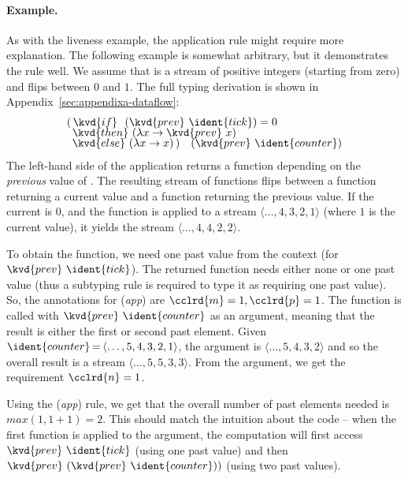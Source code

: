 
\paragraph{Example.}
As with the liveness example, the application rule might require more explanation. The following
example is somewhat arbitrary, but it demonstrates the rule well. We assume that 
is a stream of positive integers (starting from zero) and  flips between $0$ and $1$.
The full typing derivation is shown in Appendix~\ref{sec:appendixa-dataflow}:
%
\begin{equation*}
\begin{array}{l}
(\,   \kvd{if}~~(\kvd{prev}~\ident{tick})=0\\[-0.25em]
\,\,\, \kvd{then}~(\lambda x \rightarrow \kvd{prev}~x)\\[-0.25em]
\,\,\, \kvd{else}~(\lambda x \rightarrow x) \,)\quad(\kvd{prev}~\ident{counter})
\end{array}
\end{equation*}
%
The left-hand side of the application returns a function depending on the \emph{previous}
value of . The resulting stream of functions flips between a function returning
a current value and a function returning the previous value. If the current  is 0, and
the function is applied to a stream $\langle{\ldots,4,3,2,1}\rangle$
(where $1$ is the current value), it yields the stream $\langle{\ldots,4,4,2,2}\rangle$.

To obtain the function, we need one past value from the context (for $\kvd{prev}~\ident{tick}$). The
returned function needs either none or one past value (thus a subtyping rule is required to type
it as requiring one past value). So, the annotations for (\emph{app}) are $\cclrd{m}=1, \cclrd{p}=1$.
The function is called with $\kvd{prev}~\ident{counter}$ as an argument, meaning that the result
is either the first or second past element. Given
$\ident{counter}\hspace{-0.1em}=\hspace{-0.1em}\langle{\ldots,5,4,3,2,1}\rangle$, the argument
is $\langle{\ldots,5,4,3,2}\rangle$ and so the overall result is a stream $\langle{\ldots,5,5,3,3}\rangle$.
From the argument, we get the requirement $\cclrd{n}=1$.

Using the (\emph{app}) rule, we get that the overall number of past elements needed is
$\mathit{max}(1, 1+1) = 2$. This should match the intuition about the code -- when the first function
is applied to the argument, the computation will first access $\kvd{prev}~\ident{tick}$ (using one
past value) and then $\kvd{prev}~(\kvd{prev}~\ident{counter}))$ (using two past values).


